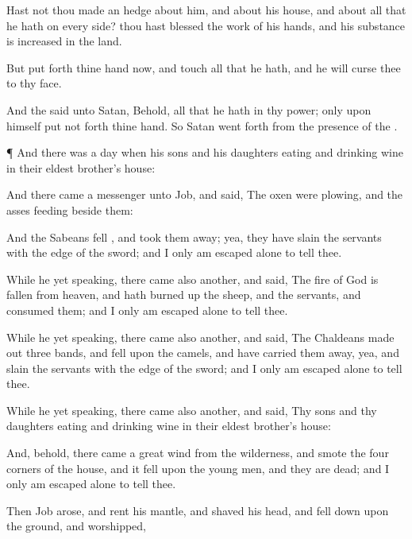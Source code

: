 {Hast not thou made an
hedge about him, and
about his
house, and about all that he hath on every
side? thou hast
blessed the
work of his
hands, and his
substance is
increased in the
land.

But put
forth thine
hand now, and
touch all that he hath, and he will
curse thee to thy
face.

And the
{}
said unto
Satan, Behold, all that he hath
{} in thy
power; only upon himself put not
forth thine
hand. So
Satan went
forth from the
presence of the
{}.


\par }{\PP {}¶ And there was a
day when his
sons and his
daughters
{}
eating and
drinking
wine in their
eldest
brother’s
house:

And there
came a
messenger unto
Job, and
said, The
oxen were
plowing, and the
asses
feeding
beside them:

And the
Sabeans
fell
{}, and took them
away; yea, they have
slain the
servants with the
edge of the
sword; and I only am
escaped alone to
tell thee.

While he
{} yet
speaking, there
came also another, and
said, The
fire of
God is
fallen from
heaven, and hath burned
up the
sheep, and the
servants, and
consumed them; and I only am
escaped alone to
tell thee.

While he
{} yet
speaking, there
came also another, and
said, The
Chaldeans made
out
three
bands, and
fell upon the
camels, and have carried them
away, yea, and
slain the
servants with the
edge of the
sword; and I only am
escaped alone to
tell thee.

While he
{} yet
speaking, there
came also another, and
said, Thy
sons and thy
daughters
{}
eating and
drinking
wine in their
eldest
brother’s
house:

And, behold, there
came a
great
wind
from the
wilderness, and
smote the
four
corners of the
house, and it
fell upon the young
men, and they are
dead; and I only am
escaped alone to
tell thee.


\par }{\PP {}Then
Job
arose, and
rent his
mantle, and
shaved his
head, and fell
down upon the
ground, and
worshipped,

}
